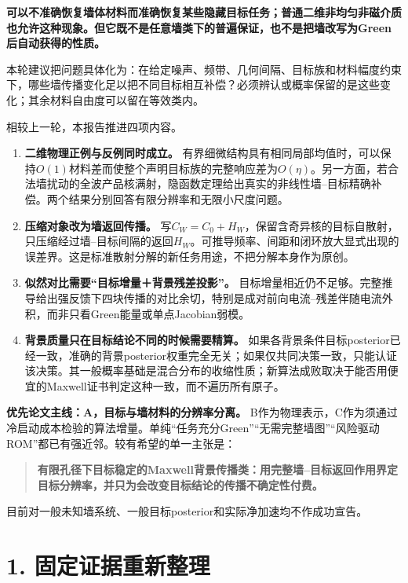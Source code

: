 \documentclass[
  10pt,
  a4paper,
]{article}
\providecommand{\tightlist}{%
  \setlength{\itemsep}{0pt}\setlength{\parskip}{0pt}}
\providecommand{\tightlist}{\setlength{\itemsep}{1pt}\setlength{\parskip}{1pt}}
\begin{document}
\textbf{可以不准确恢复墙体材料而准确恢复某些隐藏目标任务；普通二维非均匀非磁介质也允许这种现象。但它既不是任意墙类下的普遍保证，也不是把墙改写为Green后自动获得的性质。}

本轮建议把问题具体化为：在给定噪声、频带、几何间隔、目标族和材料幅度约束下，哪些墙传播变化足以把不同目标相互补偿？必须辨认或概率保留的是这些变化；其余材料自由度可以留在等效类内。

相较上一轮，本报告推进四项内容。

\begin{enumerate}
\def\labelenumi{\arabic{enumi}.}
\tightlist
\item
  \textbf{二维物理正例与反例同时成立。}
  有界细微结构具有相同局部均值时，可以保持\(O(1)\)材料差而使整个声明目标族的完整响应差为\(O(\eta)\)。另一方面，若合法墙扰动的全波产品核满射，隐函数定理给出真实的非线性墙--目标精确补偿。两个结果分别回答有限分辨率和无限小尺度问题。
\item
  \textbf{压缩对象改为墙返回传播。}
  写\(C_W=C_0+H_W\)，保留含奇异核的目标自散射，只压缩经过墙--目标间隔的返回\(H_W\)。可推导频率、间距和闭环放大显式出现的误差界。这是标准散射分解的新任务用途，不把分解本身作为原创。
\item
  \textbf{似然对比需要``目标增量＋背景残差投影''。}
  目标增量相近仍不足够。完整推导给出强反馈下四块传播的对比余切，特别是成对前向电流--残差伴随电流外积，而非只看Green能量或单点Jacobian弱模。
\item
  \textbf{背景质量只在目标结论不同的时候需要精算。}
  如果各背景条件目标posterior已经一致，准确的背景posterior权重完全无关；如果仅共同决策一致，只能认证该决策。其一般概率基础是混合分布的收缩性质；新算法成败取决于能否用便宜的Maxwell证书判定这种一致，而不遍历所有原子。
\end{enumerate}

\textbf{优先论文主线：A，目标与墙材料的分辨率分离。}
B作为物理表示，C作为须通过冷启动成本检验的算法增量。单纯``任务充分Green''``无需完整墙图''``风险驱动ROM''都已有强近邻。较有希望的单一主张是：

\begin{quote}
\textbf{有限孔径下目标稳定的Maxwell背景传播类：用完整墙--目标返回作用界定目标分辨率，并只为会改变目标结论的传播不确定性付费。}
\end{quote}

目前对一般未知墙系统、一般目标posterior和实际净加速均不作成功宣告。

\hypertarget{ux56faux5b9aux8bc1ux636eux91cdux65b0ux6574ux7406}{%
\section{1.
固定证据重新整理}\label{ux56faux5b9aux8bc1ux636eux91cdux65b0ux6574ux7406}}
\end{document}

